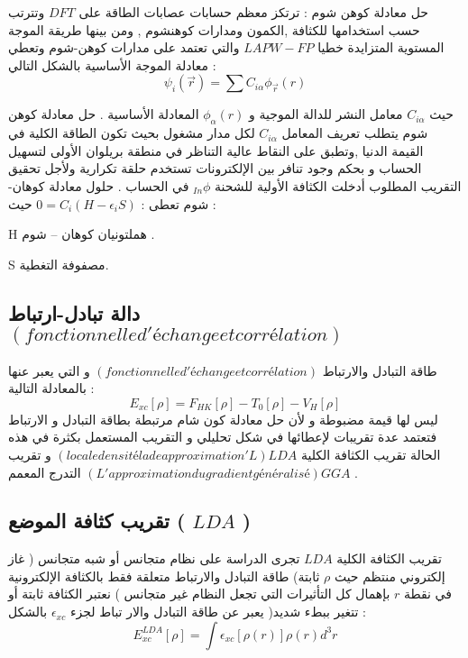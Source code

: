 حل معادلة كوهن شوم : ترتكز معظم حسابات عصابات الطاقة على $ DFT $ وتترتب حسب استخدامها  للكثافة ,الكمون ومدارات كوهنشوم , ومن بينها طريقة الموجة المستوية المتزايدة خطيا $ LAPW-FP $ والتي تعتمد على  مدارات كوهن-شوم وتعطي معادلة الموجة الأساسية بالشكل التالي :
\begin{equation}\label{key}
	\psi_{i} (\vec{r}) = \sum C_{i\alpha} \phi_{\vec{r}} (r)
\end{equation}

حيث  $ C_{i\alpha} $ معامل النشر للدالة الموجية و $ \phi_{\alpha} (r) $ المعادلة الأساسية .
حل معادلة كوهن شوم يتطلب تعريف المعامل $ C_{i\alpha} $  لكل مدار مشغول بحيث تكون الطاقة الكلية في القيمة الدنيا ,وتطبق على النقاط عالية التناظر في منطقة  بريلوان الأولى لتسهيل الحساب و بحكم وجود تنافر بين الإلكترونات تستخدم حلقة  تكرارية ولأجل تحقيق التقريب المطلوب أدخلت الكثافة الأولية للشحنة  $ _{In}\phi  $ في الحساب .  
حلول معادلة كوهان-شوم تعطى : $ 0 = C_{i} ( H - \epsilon_{i} S ) $
حيث :
\begin{list}{}{}
	\item 
	H هملتونيان كوهان – شوم .
	\item
	S مصفوفة التغطية.
\end{list}

\subsection{ دالة تبادل-ارتباط $ ( fonctionnelle d'échange et corrélation ) $  }

طاقة التبادل والارتباط $ ( fonctionnelle d'échange et corrélation ) $ و التي يعبر عنها بالمعادلة التالية :
\begin{equation}\label{}
	E_{xc} \left[\rho\right] = F_{HK} \left[\rho\right] - T_{0} \left[\rho\right] - V_{H} \left[\rho\right]	
\end{equation}
ليس لها قيمة مضبوطة و لأن حل معادلة كون شام مرتبطة بطاقة التبادل و الارتباط فتعتمد عدة  تقريبات لإعطائها في شكل تحليلي و التقريب المستعمل بكثرة  في هذه الحالة تقريب الكثافة الكلية $ ( locale densité la de approximation'L ) LDA  $ و تقريب التدرج  المعمم $ ( L'approximation du gradient généralisé ) GGA $ .

\subsection{ تقريب كثافة الموضع ( $ LDA $ ) }
تقريب الكثافة الكلية $ LDA  $ تجرى الدراسة على نظام متجانس أو شبه متجانس ( غاز إلكتروني منتظم  حيث $ \rho $  ثابتة) طاقة التبادل والارتباط متعلقة فقط بالكثافة الإلكترونية في نقطة $ r $ بإهمال كل التأثيرات التي تجعل النظام غير متجانس ) نعتبر الكثافة ثابتة أو تتغير ببطء شديد( يعبر عن طاقة التبادل والار تباط لجزء $ \epsilon_{xc} $ بالشكل :
\begin{equation}\label{}
	E_{xc}^{LDA} \left[\rho\right] =  \int  \epsilon_{xc} \left[\rho (r) \right] \rho (r) d^{3}r
\end{equation}

